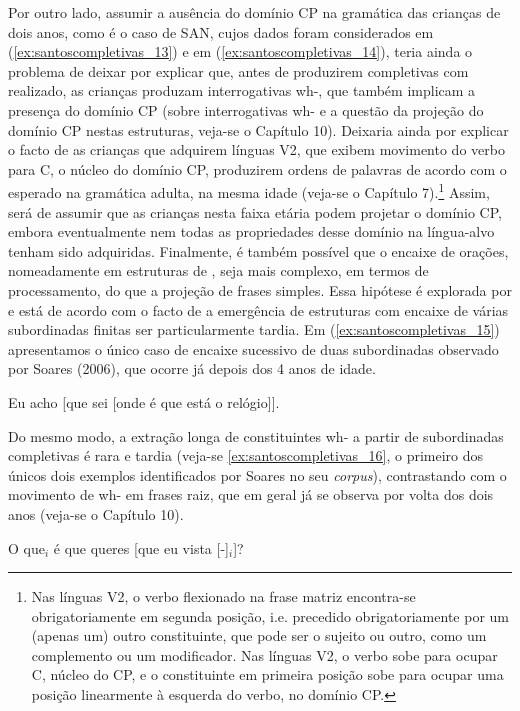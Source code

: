 \documentclass[output=paper]{LSP/langsci}
\begin{document}
Por outro lado, assumir a ausência do domínio CP na gramática das crianças de dois anos, como é o caso de SAN, cujos dados foram considerados em (\ref{ex:santoscompletivas_13}) e em (\ref{ex:santoscompletivas_14}), teria ainda o problema de deixar por explicar que, antes de produzirem completivas com  realizado, as crianças produzam interrogativas wh-, que também implicam a presença do domínio CP (sobre interrogativas wh- e a questão da projeção do domínio CP nestas estruturas, veja-se o Capítulo 10). Deixaria ainda por explicar o facto de as crianças que adquirem línguas V2, que exibem movimento do verbo para C, o núcleo do domínio CP, produzirem ordens de palavras de acordo com o esperado na gramática adulta, na mesma idade (veja-se o Capítulo 7).\footnote{Nas línguas V2, o verbo flexionado na frase matriz encontra-se obrigatoriamente em segunda posição, i.e. precedido obrigatoriamente por um (apenas um) outro constituinte, que pode ser o sujeito ou outro, como um complemento ou um modificador. Nas línguas V2, o verbo sobe para ocupar C, núcleo do CP, e o constituinte em primeira posição sobe para ocupar uma posição linearmente à esquerda do verbo, no domínio CP.} Assim, será de assumir que as crianças nesta faixa etária podem projetar o domínio CP, embora eventualmente nem todas as propriedades desse domínio na língua-alvo tenham sido adquiridas. Finalmente, é também possível que o encaixe de orações, nomeadamente em estruturas de , seja mais complexo, em termos de processamento, do que a projeção de frases simples. Essa hipótese é explorada por \citet{soares2006} e está de acordo com o facto de a emergência de estruturas com encaixe de várias subordinadas finitas ser particularmente tardia. Em (\ref{ex:santoscompletivas_15}) apresentamos o único caso de encaixe sucessivo de duas subordinadas observado por Soares (2006), que ocorre já depois dos 4 anos de idade.

\ea\label{ex:santoscompletivas_15}
Eu acho [que sei [onde é que está o relógio]].\\
\z

Do mesmo modo, a extração longa de constituintes wh- a partir de subordinadas completivas é rara e tardia (veja-se \ref{ex:santoscompletivas_16}, o primeiro dos únicos dois exemplos identificados por Soares no seu \textit{corpus}), contrastando com o movimento de wh- em frases raiz, que em geral já se observa por volta dos dois anos (veja-se o Capítulo 10).

\ea\label{ex:santoscompletivas_16}
O que$_i$ é que queres [que eu vista [-]$_i$]?\jambox{(CAR 4;5.19) \citep[368]{soares2006}]}
\z
\end{document}
